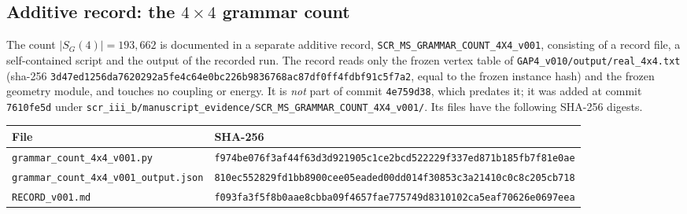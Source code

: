 \documentclass[11pt,a4paper]{article}
\theoremstyle{plain}
\theoremstyle{definition}
\theoremstyle{remark}
\newcommand{\lean}[1]{\nolinkurl{#1}}
\begin{document}
\subsection{Additive record: the $4\times4$ grammar count}
The count $|S_G(4)|=193{,}662$ is documented in a separate additive record, \lean{SCR_MS_GRAMMAR_COUNT_4X4_v001}, consisting of a record file, a self-contained script and the output of the recorded run. The record reads only the frozen vertex table of \lean{GAP4_v010/output/real_4x4.txt} (sha-256 \texttt{3d47ed1256da7620292a5fe4c64e0bc2}\texttt{26b9836768ac87df0ff4fdbf91c5f7a2}, equal to the frozen instance hash) and the frozen geometry module, and touches no coupling or energy. It is \emph{not} part of commit \texttt{4e759d38}, which predates it; it was added at commit \texttt{7610fe5d} under \lean{scr_iii_b/manuscript_evidence/SCR_MS_GRAMMAR_COUNT_4X4_v001/}. Its files have the following SHA-256 digests.
\begin{center}\small
\begin{tabularx}{\linewidth}{@{}p{5cm}X@{}}
\toprule
File & SHA-256\\
\midrule
\lean{grammar_count_4x4_v001.py} & \texttt{f974be076f3af44f63d3d921905c1ce2}\newline\texttt{bcd522229f337ed871b185fb7f81e0ae}\\
\lean{grammar_count_4x4_v001_output.json} & \texttt{810ec552829fd1bb8900cee05eaded00}\newline\texttt{dd014f30853c3a21410c0c8c205cb718}\\
\lean{RECORD_v001.md} & \texttt{f093fa3f5f8b0aae8cbba09f4657fae7}\newline\texttt{75749d8310102ca5eaf70626e0697eea}\\
\bottomrule
\end{tabularx}
\end{center}
\end{document}
